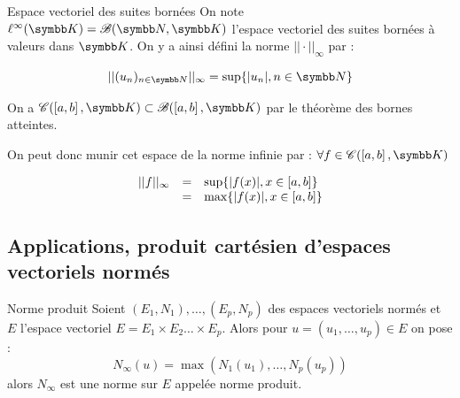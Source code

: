 \begin{definition}{Espace vectoriel des suites bornées}{}
    On note $\ell^\infty(\K) = \mathscr B(\N, \K)$ l'espace vectoriel des suites bornées
    à valeurs dans $\K$. On y a ainsi défini la norme $|| \cdot ||_\infty$ par :

    \[||(u_n)_{n \in \N} ||_\infty = \sup\{|u_n|, n \in \N\}\]
\end{definition}

\begin{definition}{}{}
    On a $\mathscr C(\inter{a}{b}, \K) \subset \mathscr B(\inter{a}{b}, \K)$
    par le théorème des bornes atteintes. 

    On peut donc munir cet espace de la norme infinie par : 
    $\forall f \in \mathscr C(\inter{a}{b}, \K)$

    \[
    \begin{array}{rcl}
        ||f ||_\infty & =& \sup\{|f(x)|, x \in \left[a, b\right]\} \\
        \space & = & \max\{|f(x)|, x \in \left[a, b\right]\} \\
    \end{array}
    \]
\end{definition}

\subsection{Applications, produit cartésien d'espaces vectoriels normés}

\begin{theoreme}{Norme produit}{}
    Soient $(E_1, N_1), \dots, (E_p, N_p)$ des espaces vectoriels normés
    et $E$ l'espace vectoriel $E = E_1 \times E_2 \dots \times E_p$.
    Alors pour $u = (u_1, \dots, u_p) \in E$ on pose :
    \[N_\infty(u) = \max(N_1(u_1), \dots, N_p(u_p))\]
    alors $N_\infty$ est une norme sur $E$ appelée norme produit. 
\end{theoreme}

